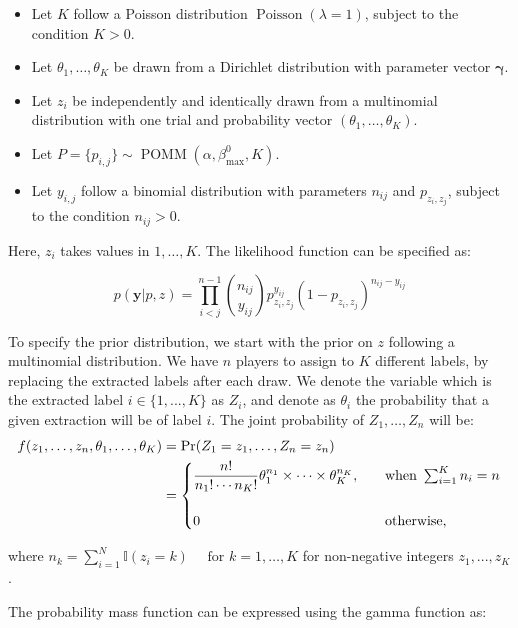 \documentclass[11pt]{amsart}
\begin{document}
\begin{itemize}
\item Let $K$ follow a Poisson distribution $\operatorname{Poisson}(\lambda=1)$, subject to the condition $K>0$.
\item Let $\theta_1, \dots, \theta_K$ be drawn from a Dirichlet distribution with parameter vector $\boldsymbol{\gamma}$.
\item Let $z_i$ be independently and identically drawn from a multinomial distribution with one trial and probability vector $(\theta_1, \dots, \theta_K)$.
\item Let $P = \{p_{i,j}\} \sim \operatorname{POMM}(\alpha,\beta^0_{\max},K)$.
\item Let $y_{i,j}$ follow a binomial distribution with parameters $n_{ij}$ and $p_{z_i, z_j}$, subject to the condition $n_{ij} > 0$.
\end{itemize}

Here, $z_i$ takes values in ${1, \dots, K}$. The likelihood function can be specified as:

\begin{equation}
p(\textbf{y} | p, z) = \prod_{i<j}^{n-1} {n_{ij} \choose y_{ij}} p_{z_i, z_j}^{y_{ij}}(1- p_{z_i, z_j})^{n_{ij}-y_{ij}}
\end{equation}

To specify the prior distribution, we start with the prior on $z$ following a multinomial distribution. We have $n$ players to assign to $K$ different labels, by replacing the extracted labels after each draw. We denote the variable which is the extracted label $i \in \{ 1, ..., K \}$ as $Z_i$, and denote as $\theta_i$ the probability that a given extraction will be of label $i$. The joint probability of $Z_1,\ldots,Z_n$ will be: 
\begin{align}
f(z_1,\ldots,z_n,\theta_1, \ldots, \theta_K ) & {} = \Pr(Z_1 = z_1,\ldots, Z_n = z_n) \\
& {} = \begin{cases} { \displaystyle {n! \over n_1!\cdots n_K!}\theta_1^{n_1}\times\cdots\times \theta_K^{n_K}}, \quad &
\text{when } \sum_{i=1}^K n_i=n \\  \\
0 & \text{otherwise,} \end{cases}
\end{align}

where $n_k = \sum_{i=1}^N \mathbb{I}(z_i = k) \quad \text{ for } k =1,\ldots,K$
for non-negative integers $z_1, ..., z_K$.

The probability mass function can be expressed using the gamma function as:
\end{document}
